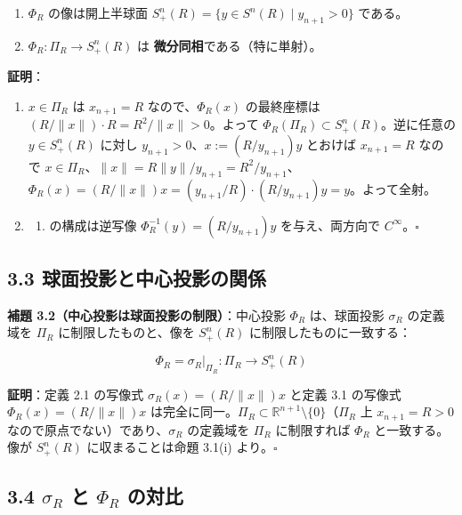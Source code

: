 \documentclass[
]{ltjsarticle}
\providecommand{\tightlist}{%
  \setlength{\itemsep}{0pt}\setlength{\parskip}{0pt}}
\begin{document}
\begin{enumerate}
\def\labelenumi{(\roman{enumi})}
\item
  \(\Phi_R\) の像は開上半球面
  \(S^n_+(R) = \{y \in S^n(R) \mid y_{n+1} > 0\}\) である。
\item
  \(\Phi_R: \Pi_R \to S^n_+(R)\) は
  \textbf{微分同相}である（特に単射）。
\end{enumerate}

\textbf{証明}：

\begin{enumerate}
\def\labelenumi{(\roman{enumi})}
\item
  \(x \in \Pi_R\) は \(x_{n+1} = R\) なので、\(\Phi_R(x)\) の最終座標は
  \((R/\|x\|) \cdot R = R^2/\|x\| > 0\)。よって
  \(\Phi_R(\Pi_R) \subset S^n_+(R)\)。逆に任意の \(y \in S^n_+(R)\)
  に対し \(y_{n+1} > 0\)、\(x := (R/y_{n+1}) y\) とおけば
  \(x_{n+1} = R\) なので
  \(x \in \Pi_R\)、\(\|x\| = R\|y\|/y_{n+1} = R^2/y_{n+1}\)、\(\Phi_R(x) = (R/\|x\|) x = (y_{n+1}/R) \cdot (R/y_{n+1}) y = y\)。よって全射。
\item
  \begin{enumerate}
  \def\labelenumii{(\roman{enumii})}
  \tightlist
  \item
    の構成は逆写像 \(\Phi_R^{-1}(y) = (R/y_{n+1}) y\) を与え、両方向で
    \(C^\infty\)。\(\square\)
  \end{enumerate}
\end{enumerate}

\subsection{3.3
球面投影と中心投影の関係}\label{ux7403ux9762ux6295ux5f71ux3068ux4e2dux5fc3ux6295ux5f71ux306eux95a2ux4fc2}

\textbf{補題 3.2（中心投影は球面投影の制限）}：中心投影 \(\Phi_R\)
は、球面投影 \(\sigma_R\) の定義域を \(\Pi_R\) に制限したものと、像を
\(S^n_+(R)\) に制限したものに一致する：

\[\Phi_R = \sigma_R \big|_{\Pi_R}: \Pi_R \to S^n_+(R) \tag{3.3}\]

\textbf{証明}：定義 2.1 の写像式 \(\sigma_R(x) = (R/\|x\|) x\) と定義
3.1 の写像式 \(\Phi_R(x) = (R/\|x\|) x\)
は完全に同一。\(\Pi_R \subset \mathbb{R}^{n+1} \setminus \{0\}\)（\(\Pi_R\)
上 \(x_{n+1} = R > 0\) なので原点でない）であり、\(\sigma_R\) の定義域を
\(\Pi_R\) に制限すれば \(\Phi_R\) と一致する。像が \(S^n_+(R)\)
に収まることは命題 3.1(i) より。\(\square\)

\subsection{\texorpdfstring{3.4 \(\sigma_R\) と \(\Phi_R\)
の対比}{3.4 \textbackslash sigma\_R と \textbackslash Phi\_R の対比}}\label{sigma_r-ux3068-phi_r-ux306eux5bfeux6bd4}
\end{document}
